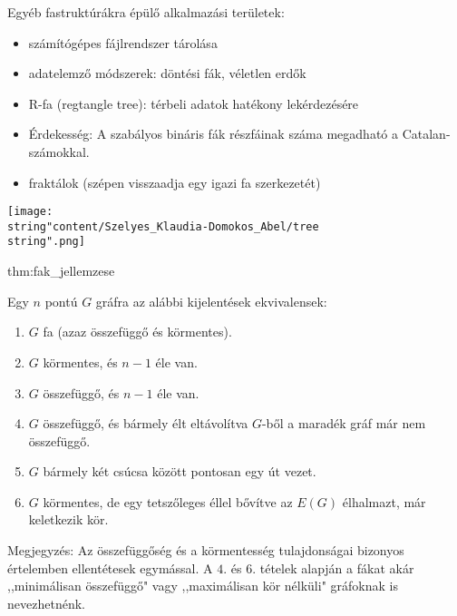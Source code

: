 Egyéb fastruktúrákra épülő alkalmazási területek: 
\begin{itemize}
	\item számítógépes fájlrendszer tárolása 
	\item adatelemző módszerek: döntési fák, véletlen erdők 
	\item R-fa (regtangle tree): térbeli adatok hatékony lekérdezésére 
	\item Érdekesség: A szabályos bináris fák részfáinak száma megadható a Catalan-számokkal. 
	\item fraktálok (szépen visszaadja egy igazi fa szerkezetét) 
\end{itemize}
\begin{center}
	\texttt{[image: \\string"content/Szelyes\_Klaudia-Domokos\_Abel/tree\\string".png]} 
	\par\end{center}
\begin{theorem}{thm:fak_jellemzese}
	
	Egy $n$ pontú $G$ gráfra az alábbi kijelentések ekvivalensek: 
	\begin{enumerate}
		\item $G$ fa (azaz összefüggő és körmentes). 
		\item $G$ körmentes, és $n-1$ éle van. 
		\item $G$ összefüggő, és $n-1$ éle van. 
		\item $G$ összefüggő, és bármely élt eltávolítva $G$-ből a maradék gráf
		már nem összefüggő. 
		\item $G$ bármely két csúcsa között pontosan egy út vezet. 
		\item $G$ körmentes, de egy tetszőleges éllel bővítve az $E(G)$ élhalmazt,
		már keletkezik kör. 
	\end{enumerate}
\end{theorem}

Megjegyzés: Az összefüggőség és a körmentesség tulajdonságai bizonyos
értelemben ellentétesek egymással. A $4.$ és $6.$ tételek alapján
a fákat akár ,,minimálisan összefüggő" vagy ,,maximálisan kör nélküli"
gráfoknak is nevezhetnénk.\\
\\

